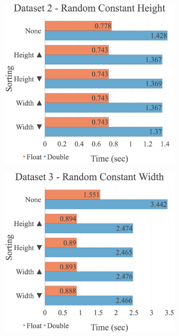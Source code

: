 \begin{figure}[H]
\begin{adjustwidth}{-2cm}{-2cm}
\begin{subfigure}{.62\textwidth}
\end{subfigure}
\par\bigskip
\par\bigskip
\begin{subfigure}{.62\textwidth}
  \centering
  \includegraphics[width=1\textwidth]{img/experiments/multi-sorts-2_RANDCONSTHEIGHT.png}
\end{subfigure}
\begin{subfigure}{.62\textwidth}
  \centering
  \includegraphics[width=1\textwidth]{img/experiments/multi-sorts-3_RANDCONSTWIDTH.png}
\end{subfigure}
\end{adjustwidth}
\end{figure}

